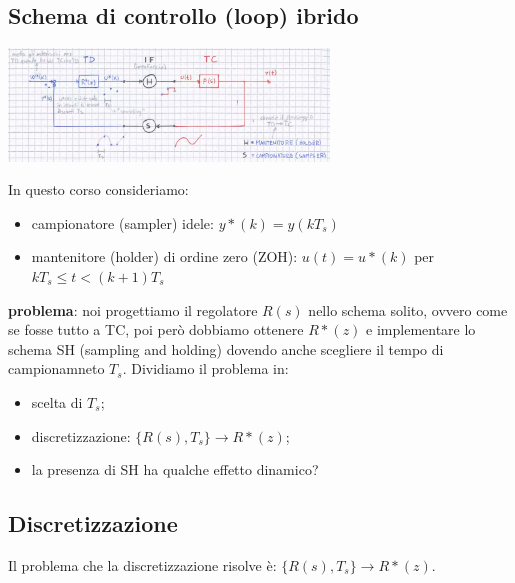     \subsection{Schema di controllo (loop) ibrido}
    \begin{center}
        \includegraphics[height=3cm]{../formulario/img10.JPG}
    \end{center}
    In questo corso consideriamo:
    \begin{itemize}
        \item campionatore (sampler) idele: $y*(k) = y(k T_s)$
        \item mantenitore (holder) di ordine zero (ZOH): $u(t) = u*(k)$ per $k T_s \leq t < (k+1)T_s$
    \end{itemize}
    \textbf{problema}: noi progettiamo il regolatore $R(s)$ nello schema solito, ovvero come se fosse tutto a TC, poi però dobbiamo ottenere $R*(z)$ e implementare lo schema SH (sampling and holding) dovendo anche scegliere il tempo di campionamneto $T_s$.\newline
    Dividiamo il problema in:
    \begin{itemize}
        \item scelta di $T_s$;
        \item discretizzazione: $\{R(s), T_s\} \rightarrow  R*(z)$;
        \item la presenza di SH ha qualche effetto dinamico?
    \end{itemize}
    \subsection{Discretizzazione}
    Il problema che la discretizzazione risolve è: $\{R(s), T_s\} \rightarrow  R*(z)$.
